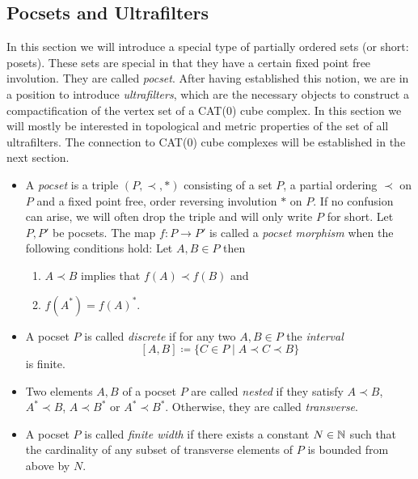 \subsection{Pocsets and Ultrafilters}
\label{sec:pocset}

In this section we will introduce a special type of partially ordered sets (or short: posets). These sets are special in that they have a certain fixed point free involution. They are called \emph{pocset}. After having established this notion, we are in a position to introduce \emph{ultrafilters}, which are the necessary objects to construct a compactification of the vertex set of a CAT(0) cube complex. In this section we will mostly be interested in topological and metric properties of the set of all ultrafilters. The connection to CAT(0) cube complexes will be established in the next section.

\begin{defin}
  \begin{itemize}
  \item A \emph{pocset} is a triple \((P, \prec, \ast)\) consisting of a set \(P\), a partial ordering \(\prec\) on \(P\) and a fixed point free, order reversing involution \(\ast\) on \(P\). If no confusion can arise, we will often drop the triple and will only write \(P\) for short. Let \(P,P'\) be pocsets. The map \(f \colon P \to P'\) is called a \emph{pocset morphism} when the following conditions hold: Let \(A,B \in P\) then
    \begin{enumerate}
    \item \(A \prec B\) implies that \(f(A) \prec f(B)\) and
    \item \(f(A^\ast) = f(A)^\ast\). 
    \end{enumerate}
  \item A pocset \(P\) is called \emph{discrete} if for any two \(A, B \in P\) the \emph{interval}
    \[
      [A,B] \coloneqq \{C \in P \mid A \prec C \prec B\}
    \]
    is finite.
  \item Two elements \(A,B\) of a pocset \(P\) are called \emph{nested} if they satisfy \(A \prec B\), \(A^\ast \prec B\), \(A \prec B^\ast\) or \(A^\ast \prec B^\ast\). Otherwise, they are called \emph{transverse}.
  \item A pocset \(P\) is called \emph{finite width} if there exists a constant \(N \in \mathbb{N}\) such that the cardinality of any subset of transverse elements of \(P\) is bounded from above by \(N\).
  \end{itemize}
\end{defin}

